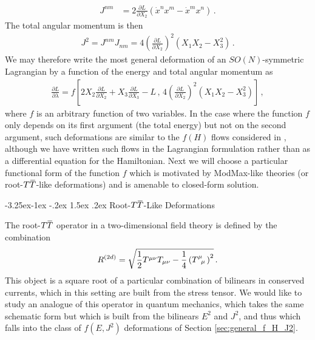\documentclass[12pt]{article}
\makeatletter
\numberwithin{equation}{section}
\renewcommand\subsection{\@startsection{subsection}{2}{\z@}%
                                     {-3.25ex\@plus -1ex \@minus -.2ex}%
                                     {1.5ex \@plus .2ex}%
                                     {\normalfont\bfseries}}
\newcommand{\overbar}[1]{\mkern 1.5mu\overline{\mkern-1.5mu#1\mkern-1.5mu}\mkern 1.5mu}
\def\TT{{T\overbar{T}}}
\makeatother
\begin{document}
%
\begin{align}
    J^{nm} &= 2 \frac{\partial L}{\partial X_2} \left( \dot{x}^n x^m - \dot{x}^m x^n \right) \, .
\end{align}
%
The total angular momentum is then
%
\begin{align}
    J^2 = J^{nm} J_{nm} = 4 \left( \frac{\partial L}{\partial X_2} \right)^2 \left( X_1 X_2 - X_3^2 \right) \, .
\end{align}
%
We may therefore write the most general deformation of an $SO(N)$-symmetric Lagrangian by a function of the energy and total angular momentum as
%
\begin{align}
    \frac{\partial L}{\partial \lambda} = f \left[ 2 X_2 \frac{\partial L}{\partial X_2} + X_3 \frac{\partial L}{\partial X_3} - L \, , \, 4 \left( \frac{\partial L}{\partial X_2} \right)^2 \left( X_1 X_2 - X_3^2 \right) \right] \, ,
\end{align}
%
where $f$ is an arbitrary function of two variables. In the case where the function $f$ only depends on its first argument (the total energy) but not on the second argument, such deformations are similar to the $f ( H )$ flows considered in \cite{Gross:2019ach,Gross:2019uxi}, although we have written such flows in the Lagrangian formulation rather than as a differential equation for the Hamiltonian. Next we will choose a particular functional form of the function $f$ which is motivated by ModMax-like theories (or root-$\TT$-like deformations) and is amenable to closed-form solution.


\subsection{Root-$\TT$-Like Deformations}

The root-$\TT$ operator in a two-dimensional field theory is defined by the combination
%
\begin{align}
    R^{(2d)} = \sqrt{ \frac{1}{2} T^{\mu \nu} T_{\mu \nu} - \frac{1}{4} \left( \tensor{T}{^\mu_\mu} \right)^2 } \, .
\end{align}
%
This object is a square root of a particular combination of bilinears in conserved currents, which in this setting are built from the stress tensor. We would like to study an analogue of this operator in quantum mechanics, which takes the same schematic form but which is built from the bilinears $E^2$ and $J^2$, and thus which falls into the class of $f ( E, J^2 )$ deformations of Section \ref{sec:general_f_H_J2}.
\end{document}
